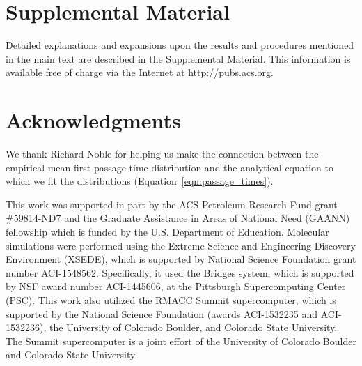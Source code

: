 \documentclass[aps,pre,preprint,groupedaddress,longbibliography]{revtex4-2}
\begin{document}
  \section*{Supplemental Material}

  Detailed explanations and expansions upon the results and procedures
  mentioned in the main text are described in the Supplemental Material. This
  information is available free of charge via the Internet at
  http://pubs.acs.org.

  \section*{Acknowledgments}
  
  We thank Richard Noble for helping us make the connection between the empirical 
  mean first passage time distribution and the analytical equation to which we fit
  the distributions (Equation~\ref{eqn:passage_times}).
  
  This work was supported in part by the ACS Petroleum Research Fund grant
  \#59814-ND7 and the Graduate Assistance in Areas of National Need (GAANN)
  fellowship which is funded by the U.S. Department of Education.  Molecular
  simulations were performed using the Extreme Science and Engineering
  Discovery Environment (XSEDE), which is supported by National Science
  Foundation grant number ACI-1548562. Specifically, it used the Bridges
  system, which is supported by NSF award number ACI-1445606, at the Pittsburgh
  Supercomputing Center (PSC). This work also utilized the RMACC Summit
  supercomputer, which is supported by the National Science Foundation (awards
  ACI-1532235 and ACI-1532236), the University of Colorado Boulder, and
  Colorado State University. The Summit supercomputer is a joint effort of the
  University of Colorado Boulder and Colorado State University.

  

    
\end{document}
